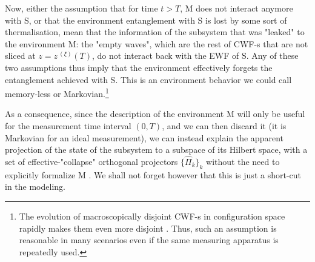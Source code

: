 \documentclass[11pt, a4paper]{article} %
\begin{document}
Now, either the assumption that for time $t>T$, M does not interact anymore with S, or that the environment entanglement with S is lost by some sort of thermalisation, mean that the information of the subsystem that was "leaked" to the environment M: the "empty waves", which are the rest of CWF-s that are not sliced at $z=z^{\:(\xi)}(T)$, do not interact back with the EWF of S. Any of these two assumptions thus imply that the environment effectively forgets the entanglement achieved with S. This is an environment behavior we could call memory-less or Markovian.\footnote{The evolution of macroscopically disjoint CWF-s in configuration space rapidly makes them even more disjoint \cite{Absolute}. Thus, such an assumption is reasonable in many scenarios even if the same measuring apparatus is repeatedly used.}\vspace{-0.1cm}

As a consequence, since the description of the environment M will only be useful for the measurement time interval $(0,T)$, and we can then discard it (it is Markovian for an ideal measurement), we can instead explain the apparent projection of the state of the subsystem to a subspace of its Hilbert space, with a set of effective-"collapse" orthogonal projectors $\{\hat{\Pi}_k\}_k$ without the need to explicitly formalize M \cite{Durr}. We shall not forget however that this is just a short-cut in the modeling.\vspace{-0.2cm}
\end{document}
